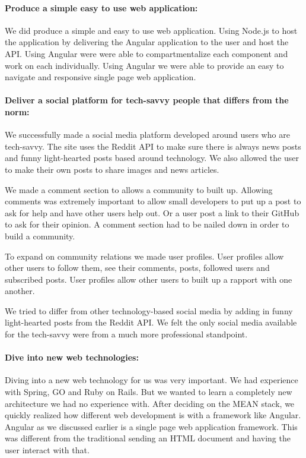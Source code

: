 \paragraph{Produce a simple easy to use web application:}
We did produce a simple and easy to use web application. Using Node.js to host the application by delivering the Angular application to the user and host the API. Using Angular were were able to compartmentalize each component and work on each individually. Using Angular we were able to provide an easy to navigate and responsive single page web application.

\paragraph{ Deliver a social platform for tech-savvy people that differs from the norm:}
We successfully made a social media platform developed around users who are tech-savvy. The site uses the Reddit API to make sure there is always news posts and funny light-hearted posts based around technology. We also allowed the user to make their own posts to share images and news articles.

We made a comment section to allows a community to built up. Allowing comments was extremely important to allow small developers to put up a post to ask for help and have other users help out. Or a user post a link to their GitHub to ask for their opinion. A comment section had to be nailed down in order to build a community.

To expand on community relations we made user profiles. User profiles allow other users to follow them, see their comments, posts, followed users and subscribed posts. User profiles allow other users to built up a rapport with one another.

We tried to differ from other technology-based social media by adding in funny light-hearted posts from the Reddit API. We felt the only social media available for the tech-savvy were from a much more professional standpoint.

\paragraph{Dive into new web technologies:}
Diving into a new web technology for us was very important. We had experience with Spring, GO and Ruby on  Rails. But we wanted to learn a completely new architecture we had no experience with. After deciding on the MEAN stack, we quickly realized how different web development is with a framework like Angular. Angular as we discussed earlier is a single page web application framework. This was different from the traditional sending an HTML document and having the user interact with that. 

